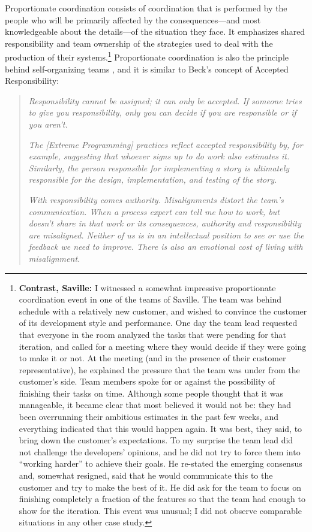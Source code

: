 Proportionate coordination consists of coordination that is performed by the people who will be primarily affected by the consequences---and most knowledgeable about the details---of the situation they face. It emphasizes shared responsibility and team ownership of the strategies used to deal with the production of their systems.\footnote{\textbf{Contrast, Saville:} I witnessed a somewhat impressive proportionate coordination event in one of the teams of Saville. The team was behind schedule with a relatively new customer, and wished to convince the customer of its development style and performance. One day the team lead requested that everyone in the room analyzed the tasks that were pending for that iteration, and called for a meeting where they would decide if they were going to make it or not. At the meeting (and in the presence of their customer representative), he explained the pressure that the team was under from the customer's side. Team members spoke for or against the possibility of finishing their tasks on time. Although some people thought that it was manageable, it became clear that most believed it would not be: they had been overrunning their ambitious estimates in the past few weeks, and everything indicated that this would happen again. It was best, they said, to bring down the customer's expectations. To my surprise the team lead did not challenge the developers' opinions, and he did not try to force them into ``working harder'' to achieve their goals. He re-stated the emerging consensus and, somewhat resigned, said that he would communicate this to the customer and try to make the best of it. He did ask for the team to focus on finishing completely a fraction of the features so that the team had enough to show for the iteration. This event was unusual; I did not observe comparable situations in any other case study.} Proportionate coordination is also the principle behind self-organizing teams \cite{Moe2009}, and it is similar to Beck's  concept of Accepted Responsibility:

\begin{quote}
\emph{Responsibility cannot be assigned; it can only be accepted. If someone tries to give you responsibility, only you can decide if you are responsible or if you aren't.}
\par \emph{The [Extreme Programming] practices reflect accepted responsibility by, for example, suggesting that whoever signs up to do work also estimates it. Similarly, the person responsible for implementing a story is ultimately responsible for the design, implementation, and testing of the story.}
\par \emph{With responsibility comes authority. Misalignments distort the team's communication. When a process expert can tell me how to work, but doesn't share in that work or its consequences, authority and responsibility are misaligned. Neither of us is in an intellectual position to see or use the feedback we need to improve. There is also an emotional cost of living with misalignment.}
\end{quote}

